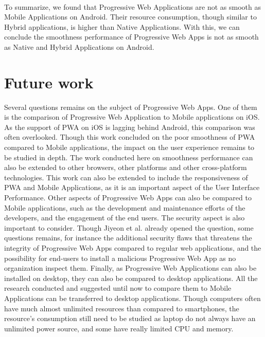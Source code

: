 \documentclass{kththesis}
\begin{document}
\paragraph{}
To summarize, we found that Progressive Web Applications are not as smooth as Mobile Applications on Android. Their resource consumption, though similar to Hybrid applications, is higher than Native Applications. With this, we can conclude the smoothness performance of Progressive Web Apps is not as smooth as Native and Hybrid Applications on Android. 
\fi

\section{Future work}
Several questions remains on the subject of Progressive Web Apps. One of them is the comparison of Progressive Web Application to Mobile applications on iOS. As the support of PWA on iOS is lagging behind Android, this comparison was often overlooked. \newline
Though this work concluded on the poor smoothness of PWA compared to Mobile applications, the impact  on the user experience remains to be studied in depth. 
The work conducted here on smoothness performance can also be extended to other browsers, other platforms and other cross-platform technologies. This work can also be extended to include the responsiveness of PWA and Mobile Applications, as it is an important aspect of the User Interface Performance. \newline
Other aspects of Progressive Web Apps can also be compared to Mobile applications, such as the development and maintenance efforts of the developers, and the engagement of the end users. \newline
The security aspect is also important to consider. Though Jiyeon et al. \cite{Pride_Prejudice} already opened the question, some questions remains, for instance the additional security flaws that threatens the integrity of Progressive Web Apps compared to regular web applications, and the possibility for end-users to install a malicious Progressive Web App as no organization inspect them.
Finally, as Progressive Web Applications can also be installed on desktop, they can also be compared to desktop applications. All the research conducted and suggested until now to compare them to Mobile Applications can be transferred to desktop applications. Though computers often have much almost unlimited resources than compared to smartphones, the resource's consumption still need to be studied as laptop do not always have an unlimited power source, and some have really limited CPU and memory. 
\end{document}
